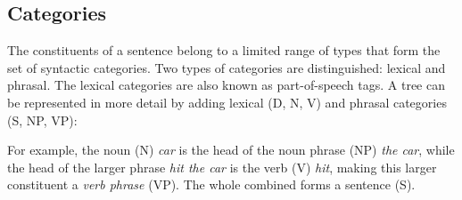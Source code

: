\subsection{Categories}
The constituents of a sentence belong to a limited range of types that form the set of syntactic categories. Two types of categories are distinguished: lexical and phrasal. The lexical categories are also known as part-of-speech tags. A tree can be represented in more detail by adding lexical (D, N, V) and phrasal categories (S, NP, VP):
\begin{figure}[h]{\textwidth}
  \center
\end{figure}
For example, the noun (N) \textit{car} is the head of the noun phrase (NP) \textit{the car}, while the head of the larger phrase \textit{hit the car} is the verb (V) \textit{hit}, making this larger constituent a \textit{verb phrase} (VP). The whole combined forms a sentence (S).

